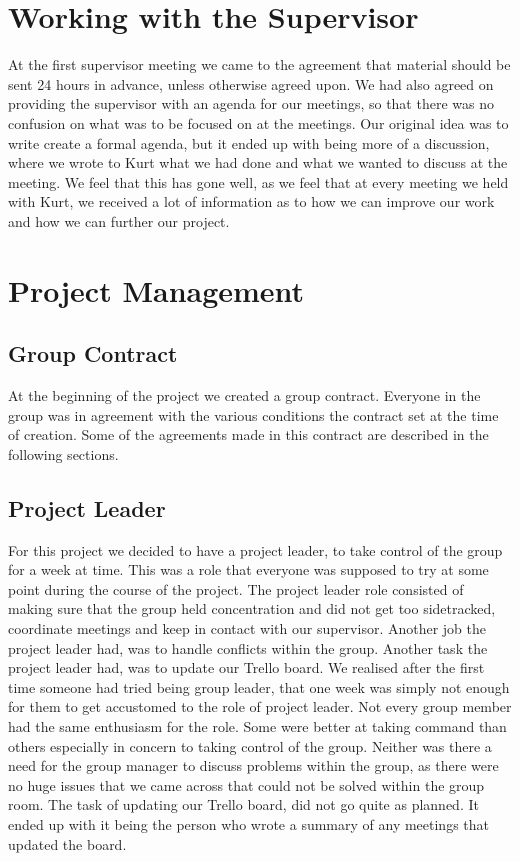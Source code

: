 \documentclass{article}
\begin{document}
\section{Working with the Supervisor}
At the first supervisor meeting we came to the agreement that material should be sent 24 hours in advance, unless otherwise agreed upon. 
We had also agreed on providing the supervisor with an agenda for our meetings, so that there was no confusion on what was to be focused on at the meetings. 
Our original idea was to write create a formal agenda, but it ended up with being more of a discussion, where we wrote to Kurt what we had done and what we wanted to discuss at the meeting. 
We feel that this has gone well, as we feel that at every meeting we held with Kurt, we received a lot of information as to how we can improve our work and how we can further our project.

\section{Project Management}
\subsection{Group Contract}
At the beginning of the project we created a group contract. 
Everyone in the group was in agreement with the various conditions the contract set at the time of creation. 
Some of the agreements made in this contract are described in the following sections.

\subsection{Project Leader}
For this project we decided to have a project leader, to take control of the group for a week at time. 
This was a role that everyone was supposed to try at some point during the course of the project. 
The project leader role consisted of making sure that the group held concentration and did not get too sidetracked, coordinate meetings and keep in contact with our supervisor. 
Another job the project leader had, was to handle conflicts within the group. 
Another task the project leader had, was to update our Trello board.
We realised after the first time someone had tried being group leader, that one week was simply not enough for them to get accustomed to the role of project leader.
Not every group member had the same enthusiasm for the role. 
Some were better at taking command than others especially in concern to taking control of the group.
Neither was there a need for the group manager to discuss problems within the group, as there were no huge issues that we came across that could not be solved within the group room.
The task of updating our Trello board, did not go quite as planned. 
It ended up with it being the person who wrote a summary of any meetings that updated the board.
\end{document}
